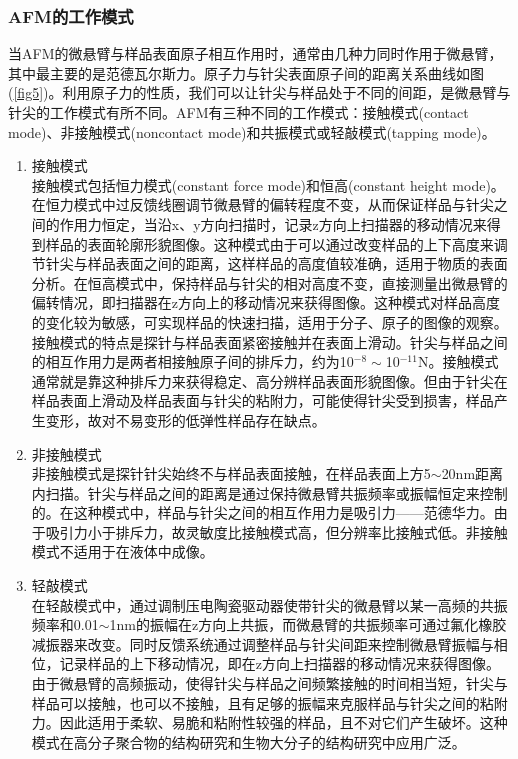 \documentclass[a4paper]{article}
\begin{document}
\subsubsection{AFM的工作模式}
当AFM的微悬臂与样品表面原子相互作用时，通常由几种力同时作用于微悬臂，其中最主要的是范德瓦尔斯力。原子力与针尖表面原子间的距离关系曲线如图(\ref{fig5})。利用原子力的性质，我们可以让针尖与样品处于不同的间距，是微悬臂与针尖的工作模式有所不同。AFM有三种不同的工作模式：接触模式(contact mode)、非接触模式(noncontact mode)和共振模式或轻敲模式(tapping mode)。
\begin{enumerate}
\item 接触模式\\
接触模式包括恒力模式(constant force mode)和恒高(constant height mode)。在恒力模式中过反馈线圈调节微悬臂的偏转程度不变，从而保证样品与针尖之间的作用力恒定，当沿x、y方向扫描时，记录z方向上扫描器的移动情况来得到样品的表面轮廓形貌图像。这种模式由于可以通过改变样品的上下高度来调节针尖与样品表面之间的距离，这样样品的高度值较准确，适用于物质的表面分析。在恒高模式中，保持样品与针尖的相对高度不变，直接测量出微悬臂的偏转情况，即扫描器在z方向上的移动情况来获得图像。这种模式对样品高度的变化较为敏感，可实现样品的快速扫描，适用于分子、原子的图像的观察。接触模式的特点是探针与样品表面紧密接触并在表面上滑动。针尖与样品之间的相互作用力是两者相接触原子间的排斥力，约为10$^{-8}\sim$10$^{-11}$N。接触模式通常就是靠这种排斥力来获得稳定、高分辨样品表面形貌图像。但由于针尖在样品表面上滑动及样品表面与针尖的粘附力，可能使得针尖受到损害，样品产生变形，故对不易变形的低弹性样品存在缺点。
\item 非接触模式\\
非接触模式是探针针尖始终不与样品表面接触，在样品表面上方5$\sim$20nm距离内扫描。针尖与样品之间的距离是通过保持微悬臂共振频率或振幅恒定来控制的。在这种模式中，样品与针尖之间的相互作用力是吸引力——范德华力。由于吸引力小于排斥力，故灵敏度比接触模式高，但分辨率比接触式低。非接触模式不适用于在液体中成像。
\item 轻敲模式\\
在轻敲模式中，通过调制压电陶瓷驱动器使带针尖的微悬臂以某一高频的共振频率和0.01$\sim$1nm的振幅在z方向上共振，而微悬臂的共振频率可通过氟化橡胶减振器来改变。同时反馈系统通过调整样品与针尖间距来控制微悬臂振幅与相位，记录样品的上下移动情况，即在z方向上扫描器的移动情况来获得图像。由于微悬臂的高频振动，使得针尖与样品之间频繁接触的时间相当短，针尖与样品可以接触，也可以不接触，且有足够的振幅来克服样品与针尖之间的粘附力。因此适用于柔软、易脆和粘附性较强的样品，且不对它们产生破坏。这种模式在高分子聚合物的结构研究和生物大分子的结构研究中应用广泛。
\end{enumerate}
\end{document}
